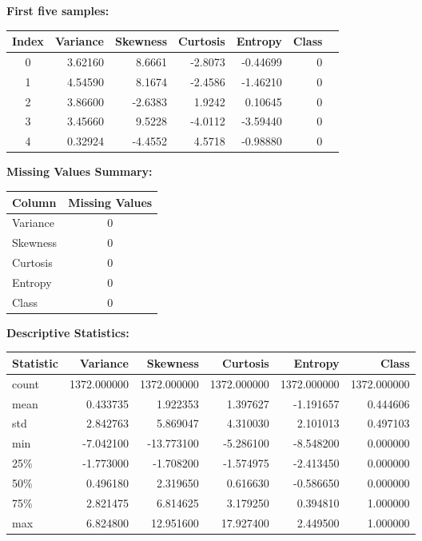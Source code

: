 \documentclass[11pt]{article}
\begin{document}
\vspace{3mm}
\textbf{First five samples:}
\begin{center}
\begin{tabular}{crrrrrc}
\toprule
\textbf{Index} & \textbf{Variance} & \textbf{Skewness} & \textbf{Curtosis} & \textbf{Entropy} & \textbf{Class} \\
\midrule
0 & 3.62160  &  8.6661 & -2.8073 & -0.44699 & 0 \\
1 & 4.54590  &  8.1674 & -2.4586 & -1.46210 & 0 \\
2 & 3.86600  & -2.6383 &  1.9242 &  0.10645 & 0 \\
3 & 3.45660  &  9.5228 & -4.0112 & -3.59440 & 0 \\
4 & 0.32924  & -4.4552 &  4.5718 & -0.98880 & 0 \\
\bottomrule
\end{tabular}
\end{center}

\vspace{3mm}
\textbf{Missing Values Summary:}
\begin{center}
\begin{tabular}{lc}
\toprule
\textbf{Column} & \textbf{Missing Values} \\
\midrule
Variance & 0 \\
Skewness & 0 \\
Curtosis & 0 \\
Entropy  & 0 \\
Class    & 0 \\
\bottomrule
\end{tabular}
\end{center}

\vspace{3mm}
\textbf{Descriptive Statistics:}
\begin{center}
\begin{tabular}{lrrrrr}
\toprule
\textbf{Statistic} & \textbf{Variance} & \textbf{Skewness} & \textbf{Curtosis} & \textbf{Entropy} & \textbf{Class} \\
\midrule
count & 1372.000000 & 1372.000000 & 1372.000000 & 1372.000000 & 1372.000000 \\
mean  &    0.433735 &    1.922353 &    1.397627 &   -1.191657 &    0.444606 \\
std   &    2.842763 &    5.869047 &    4.310030 &    2.101013 &    0.497103 \\
min   &   -7.042100 &  -13.773100 &   -5.286100 &   -8.548200 &    0.000000 \\
25\%  &   -1.773000 &   -1.708200 &   -1.574975 &   -2.413450 &    0.000000 \\
50\%  &    0.496180 &    2.319650 &    0.616630 &   -0.586650 &    0.000000 \\
75\%  &    2.821475 &    6.814625 &    3.179250 &    0.394810 &    1.000000 \\
max   &    6.824800 &   12.951600 &   17.927400 &    2.449500 &    1.000000 \\
\bottomrule
\end{tabular}
\end{center}
\end{document}
